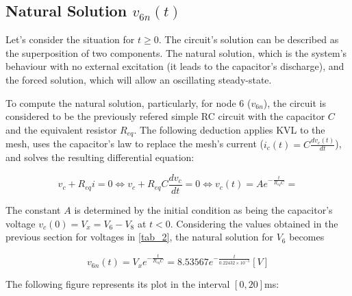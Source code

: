 \newpage

\subsection{Natural Solution $v_{6n}(t)$}

\vspace{3mm}
\par Let's consider the situation for $t\geq0$. The circuit's solution can be described as the superposition of two components. The natural solution, which is the system's behaviour with no external excitation (it leads to the capacitor's discharge), and the forced solution, which will allow an oscillating steady-state.

\vspace{3mm}
\par To compute the natural solution, particularly, for node $6$ ($v_{6n}$), the circuit is considered to be the previously refered simple RC circuit with the capacitor $C$ and the equivalent resistor $R_{eq}$.
The following deduction applies KVL to the mesh, uses the capacitor's law to replace the mesh's current ($i_c(t)=C\frac{dv_c(t)}{dt}$), and solves the resulting differential equation:

\begin{equation}
 v_c+R_{eq}i=0 \Leftrightarrow v_c+R_{eq}C\frac{dv_c}{dt}=0 \Leftrightarrow v_c(t)=Ae^{-\frac{t}{R_{eq}C}}=
\end{equation}

\par The constant $A$ is determined by the initial condition as being the capacitor's voltage $v_c(0)=V_x=V_6-V_8$ at $t<0$. Considering the values obtained in the previous section for voltages in \ref{tab_2}, the natural solution for $V_6$ becomes

\begin{equation}
  v_{6n}(t)=V_xe^{-\frac{t}{R_{eq}C}}=8.53567e^{-\frac{t}{0.22432 \times 10^{-3}}} [V]
\end{equation}

\par The following figure represents its plot in the interval $[0,20]$ms:

